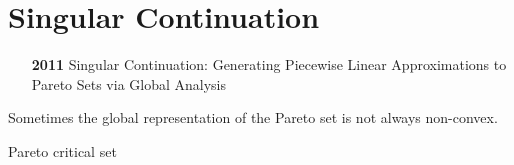 \section{Singular Continuation}

\begin{itemize}
\item [\textbf{2011}] Singular Continuation: Generating Piecewise Linear Approximations to Pareto Sets via Global Analysis~\cite{doi:10.1137/100784746}
\end{itemize}

Sometimes the global representation of the Pareto set is not always non-convex.

Pareto critical set